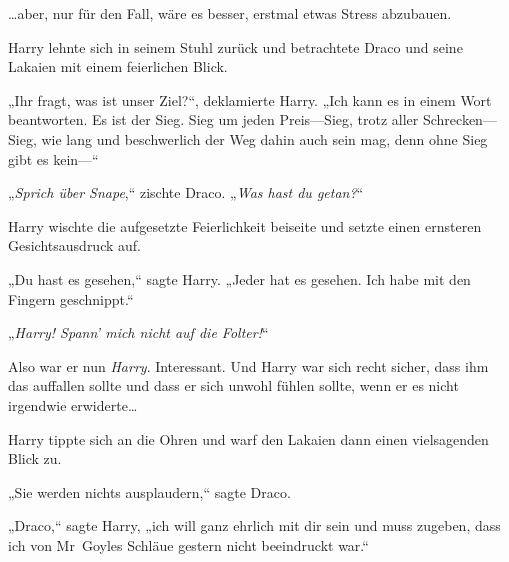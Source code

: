 …aber, nur für den Fall, wäre es besser, erstmal etwas Stress abzubauen.

Harry lehnte sich in seinem Stuhl zurück und betrachtete Draco und seine Lakaien mit einem feierlichen Blick.

„Ihr fragt, was ist unser Ziel?“, deklamierte Harry. „Ich kann es in einem Wort beantworten. Es ist der Sieg. Sieg um jeden Preis—Sieg, trotz aller Schrecken—Sieg, wie lang und beschwerlich der Weg dahin auch sein mag, denn ohne Sieg gibt es kein—“

„\emph{Sprich über Snape},“ zischte Draco. „\emph{Was hast du getan?}“

Harry wischte die aufgesetzte Feierlichkeit beiseite und setzte einen ernsteren Gesichtsausdruck auf.

„Du hast es gesehen,“ sagte Harry. „Jeder hat es gesehen. Ich habe mit den Fingern geschnippt.“

„\emph{Harry! Spann’ mich nicht auf die Folter!}“

Also war er nun \emph{Harry}. Interessant. Und Harry war sich recht sicher, dass ihm das auffallen sollte und dass er sich unwohl fühlen sollte, wenn er es nicht irgendwie erwiderte…

Harry tippte sich an die Ohren und warf den Lakaien dann einen vielsagenden Blick zu.

„Sie werden nichts ausplaudern,“ sagte Draco.

„Draco,“ sagte Harry, „ich will ganz ehrlich mit dir sein und muss zugeben, dass ich von Mr~Goyles Schläue gestern nicht beeindruckt war.“

